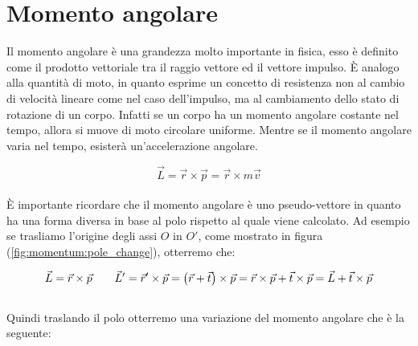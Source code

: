 \section{Momento angolare}
Il momento angolare è una grandezza molto importante in fisica, esso è
definito come il prodotto vettoriale tra il raggio vettore ed il vettore
impulso. È analogo alla quantità di moto, in quanto esprime un
concetto di resistenza non al cambio di velocità lineare come nel caso
dell'impulso, ma al cambiamento dello stato di rotazione di un corpo.
Infatti se un corpo ha un momento angolare costante nel tempo, allora si
muove di moto circolare uniforme. Mentre se il momento angolare varia nel
tempo, esisterà un'accelerazione angolare.

\begin{equation}
    \boxed{\vec L = \vec r \times \vec p = \vec r \times m\vec v}
\label{eq:momentum:L_def}
\end{equation}
\\
È importante ricordare che il momento angolare è uno pseudo-vettore in quanto
ha una forma diversa in base al polo rispetto al quale viene calcolato.
Ad esempio se trasliamo l'origine degli assi $O$ in $O'$, come mostrato in
figura (\ref{fig:momentum:pole_change}), otterremo che:

\begin{equation}
    \vec L = \vec r \times \vec p\quad \quad \vec L' = \vec r '\times\vec p =
    \left(\vec r + \vec t\right)\times \vec p = \vec r \times \vec p + \vec t\times
    \vec p = \vec L + \vec t\times\vec p
\end{equation}
\\
Quindi traslando il polo otterremo una variazione del momento angolare che è
la seguente:


